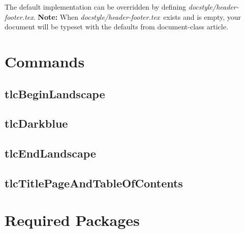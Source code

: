 \documentclass[12pt]{tlc-article}
\def\tlchf{\textit{docstyle/header-footer.tex}}
\begin{document}
The default implementation can be overridden by defining \tlchf. \textbf{Note:}
When \tlchf\ exists and is empty, your document will be typeset with the
defaults from document-class article.


\section{Commands}
\subsection{tlcBeginLandscape}
\subsection{tlcDarkblue}
\subsection{tlcEndLandscape}
\subsection{tlcTitlePageAndTableOfContents}


\section{Required Packages}

\end{document}
